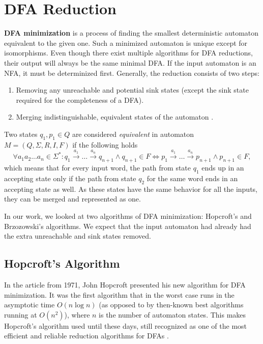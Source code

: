 \section{DFA Reduction}
\textbf{DFA minimization} is a process of finding the smallest deterministic automaton equivalent to the given one. Such a minimized automaton is unique except for isomorphisms. Even though there exist multiple algorithms for DFA reductions, their output will always be the same minimal DFA. If the input automaton is an NFA, it must be determinized first. Generally, the reduction consists of two steps:
\begin{enumerate}
    \item Removing any unreachable and potential sink states (except the sink state required for the completeness of a DFA).
    \item Merging indistinguishable, equivalent states of the automaton \cite{TIN}.
\end{enumerate}

Two states $q_1,p_1 \in Q$ are considered \textit{equivalent} in automaton $M=(Q, \Sigma, R, I, F)$ if the following holds
\begin{equation*}
    \forall a_1 a_2...a_n \in \Sigma^{*}: q_1 \xrightarrow{a_1} \dots \xrightarrow{a_n} q_{n+1} \land q_{n+1} \in F \iff p_1 \xrightarrow{a_1} \dots \xrightarrow{a_n} p_{n+1} \land p_{n+1} \in F,
\end{equation*}
which means that for every input word, the path from state $q_1$ ends up in an accepting state only if the path from state $q_2$ for the same word ends in an accepting state as well. As these states have the same behavior for all the inputs, they can be merged and represented as one.

In our work, we looked at two algorithms of DFA minimization: Hopcroft’s and Brzozowski’s algorithms. We expect that the input automaton had already had the extra unreachable and sink states removed.

\subsection{Hopcroft's Algorithm}
In the article \cite{Hopcroft1971} from 1971, John Hopcroft presented his new algorithm for DFA minimization. It was the first algorithm that in the worst case runs in the asymptotic time $O(n\log n)$ (as opposed to by then-known best algorithms running at $O(n^2)$), where $n$ is the number of automaton states.
This makes Hopcroft’s algorithm used until these days, still recognized as one of the most efficient and reliable reduction algorithms for DFAs \cite{Gracia, Paun2009}.


